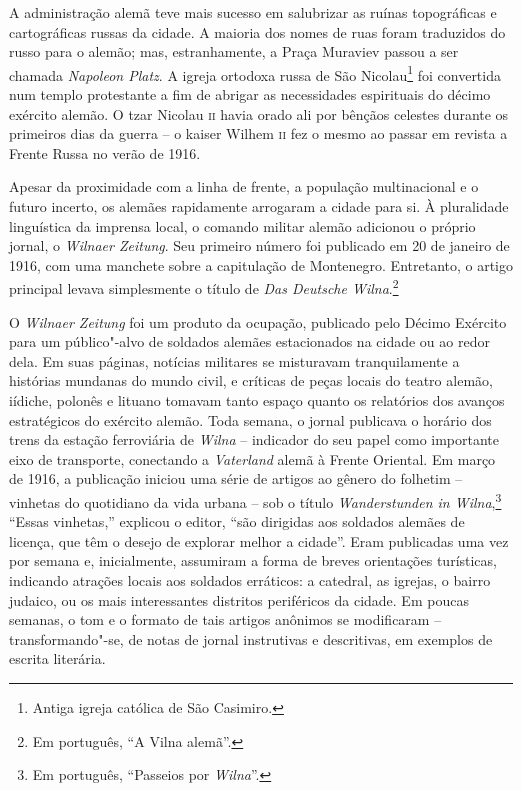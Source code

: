 A administração alemã teve mais sucesso em salubrizar as ruínas
topográficas e cartográficas russas da cidade. A maioria dos nomes de
ruas foram traduzidos do russo para o alemão; mas, estranhamente, a
Praça Muraviev passou a ser chamada \textit{Napoleon Platz}. A igreja
ortodoxa russa de São Nicolau\footnote{Antiga igreja católica de São Casimiro.}
foi convertida num templo protestante a fim de abrigar as necessidades
espirituais do décimo exército alemão. O tzar Nicolau \textsc{ii} havia orado ali
por bênçãos celestes durante os primeiros dias da guerra -- o kaiser
Wilhem \textsc{ii} fez o mesmo ao passar em revista a Frente Russa no verão de
1916.

\asterisc

Apesar da proximidade com a linha de frente, a população multinacional e
o futuro incerto, os alemães rapidamente arrogaram a cidade para si. À
pluralidade linguística da imprensa local, o comando militar alemão
adicionou o próprio jornal, o \textit{Wilnaer Zeitung}. Seu primeiro
número foi publicado em 20 de janeiro de 1916, com uma manchete sobre a
capitulação de Montenegro. Entretanto, o artigo principal levava
simplesmente o título de \textit{Das Deutsche Wilna}.\footnote{Em português, ``A Vilna alemã''.}

O \textit{Wilnaer Zeitung} foi um produto da ocupação, publicado pelo
Décimo Exército para um público"-alvo de soldados alemães estacionados na
cidade ou ao redor dela. Em suas páginas, notícias militares se
misturavam tranquilamente a histórias mundanas do mundo civil, e críticas
de peças locais do teatro alemão, iídiche, polonês e lituano tomavam
tanto espaço quanto os relatórios dos avanços estratégicos do exército
alemão. Toda semana, o jornal publicava o horário dos trens da estação
ferroviária de \textit{Wilna} -- indicador do seu papel como importante eixo de
transporte, conectando a \textit{Vaterland} alemã à Frente Oriental. Em
março de 1916, a publicação iniciou uma série de artigos ao gênero do
folhetim -- vinhetas do quotidiano da vida urbana -- sob o título
\textit{Wanderstunden in Wilna},\footnote{Em português, ``Passeios por \textit{Wilna}''.} ``Essas vinhetas,''
explicou o editor, ``são dirigidas aos soldados alemães de licença, que
têm o desejo de explorar melhor a cidade''. Eram publicadas uma vez por
semana e, inicialmente, assumiram a forma de breves orientações
turísticas, indicando atrações locais aos soldados erráticos: a
catedral, as igrejas, o bairro judaico, ou os mais interessantes
distritos periféricos da cidade. Em poucas semanas, o tom e o formato de
tais artigos anônimos se modificaram -- transformando"-se, de notas de
jornal instrutivas e descritivas, em exemplos de escrita literária.

